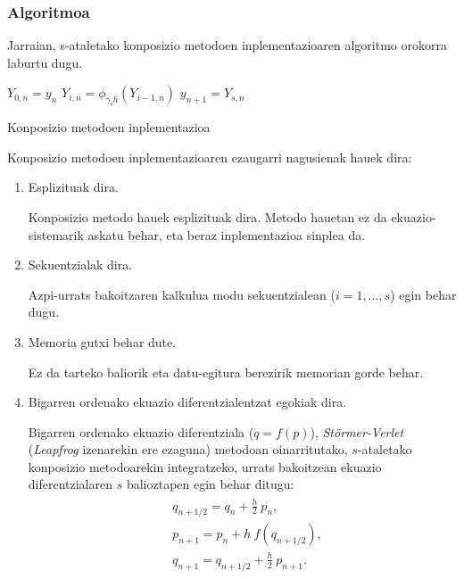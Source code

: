 \subsubsection*{Algoritmoa}
Jarraian, s-ataletako konposizio metodoen inplementazioaren algoritmo orokorra laburtu dugu.

\begin{algorithm}[H]
 \BlankLine
  {
   \BlankLine
    $Y_{0,n}=y_{n} $\;
    \BlankLine
   {
    \BlankLine 
    $Y_{i,n}=\phi_{\gamma_i h}(Y_{i-1,n})$\;
   }
   \BlankLine
    $y_{n+1}=Y_{s,n}$\;
   \BlankLine
 }
 \caption{Konposizio metodoen inplementazioa}
 \label{alg:konp}
\end{algorithm}
 
Konposizio metodoen inplementazioaren ezaugarri nagusienak hauek dira:
\begin{enumerate}
\item{Esplizituak dira.}

Konposizio metodo hauek esplizituak dira. Metodo hauetan ez da ekuazio-sistemarik askatu behar, eta beraz inplementazioa sinplea da. 

\item{Sekuentzialak dira.}

Azpi-urrats bakoitzaren kalkulua modu sekuentzialean ($i=1,\dots,s$) egin behar dugu.

\item{Memoria gutxi behar dute.}

Ez da tarteko baliorik eta datu-egitura berezirik memorian gorde behar.   

\item{Bigarren ordenako ekuazio diferentzialentzat egokiak dira.}

Bigarren ordenako ekuazio diferentziala ($\ddot{q}=f(p)$), \emph{Störmer-Verlet} (\emph{Leapfrog} izenarekin ere ezaguna) metodoan oinarritutako, $s$-ataletako konposizio metodoarekin integratzeko, urrats bakoitzean ekuazio diferentzialaren $s$ balioztapen egin behar ditugu:
\begin{align}
\begin{split}
&q_{{n+1}/{2}}=q_n+\frac{h}{2} \ p_n,\\
&p_{n+1}=p_n+h \ f(q_{{n+1}/{2}}),\\
&q_{n+1}=q_{{n+1}/{2}}+\frac{h}{2} \ p_{n+1}.
\end{split}
\label{eq:stverlet}
\end{align}


\end{enumerate}

